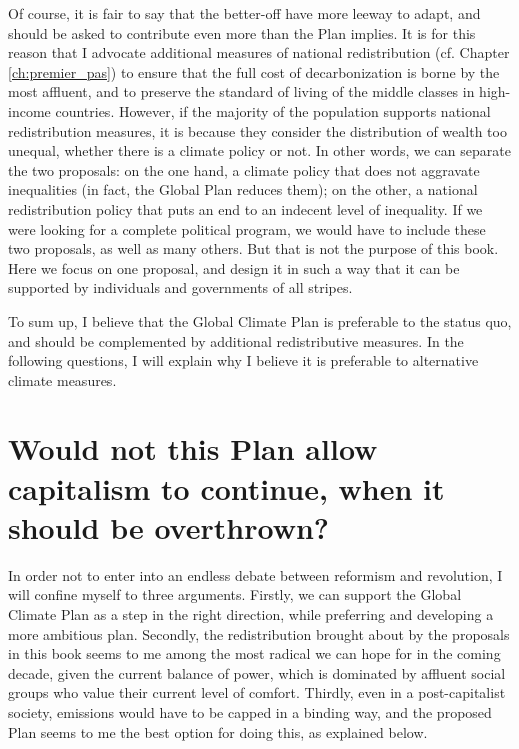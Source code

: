 \documentclass[a5paper,english,openany]{memoir}
\begin{document}
Of course, it is fair to say that the better-off %
have more leeway to adapt, and should be asked to contribute even more than the Plan implies. It is for this reason that I advocate additional measures of national redistribution (cf. Chapter \ref{ch:premier_pas}) to ensure that the full cost of decarbonization %
is borne by the most affluent, and to preserve the standard of living of the middle classes in high-income countries. However, if the majority of the population supports national redistribution measures, it is because they consider the distribution of wealth too unequal, whether there is a climate policy or not. In other words, we can separate the two proposals: on the one hand, a climate policy that does not aggravate inequalities (in fact, the Global Plan reduces them); on the other, a national redistribution policy that puts an end to an indecent level of inequality. If we were looking for a complete political program, we would %
have to include these two proposals, as well as many others. But that is %
not the purpose of this book. Here we focus %
on one proposal, and design it in such a way that it can be supported by individuals and governments of all stripes. 

To sum up, I believe that the Global Climate Plan is preferable to the status quo, and should be complemented by additional redistributive measures. In the following questions, I will explain why I believe it is preferable to alternative climate measures. 


\section*{\normalsize Would not this Plan allow capitalism to continue, when it should be overthrown?}\label{q:capitalism}

In order %
not to enter into an endless debate between reformism and revolution, I will confine myself to three arguments. Firstly, we can support the Global Climate Plan as a step in the right direction, while preferring and developing a more ambitious plan. Secondly, the redistribution brought about by the proposals in this book seems to me among the most radical we can hope for in the coming decade, given the current balance of power, which is %
dominated by affluent social groups who value their %
current level of comfort. %
Thirdly, even in a post-capitalist society, emissions would have to be capped in a binding way, and the proposed Plan seems to me the best option for doing this, as explained below. %
\end{document}
